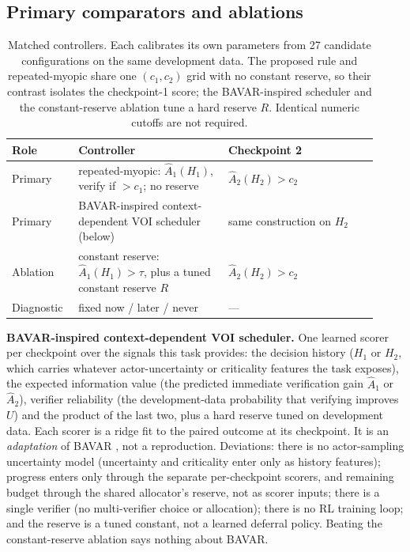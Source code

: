 \subsection{Primary comparators and ablations}

\begin{table}[t]
\centering
\small
\setlength{\tabcolsep}{4pt}
\begin{tabular}{@{}p{0.16\linewidth}p{0.38\linewidth}p{0.38\linewidth}@{}}
\toprule
Role & Controller & Checkpoint 2 \\
\midrule
Primary & repeated-myopic: $\hat A_1(H_1)$, verify if $>c_1$; no reserve & $\hat A_2(H_2)>c_2$ \\
Primary & BAVAR-inspired context-dependent VOI scheduler (below) & same construction on $H_2$ \\
Ablation & constant reserve: $\hat A_1(H_1)>\tau$, plus a tuned constant reserve $R$ & $\hat A_2(H_2)>c_2$ \\
Diagnostic & fixed now / later / never & --- \\
\bottomrule
\end{tabular}
\caption{Matched controllers.  Each calibrates its own parameters from 27
candidate configurations on the same development data.  The proposed rule and
repeated-myopic share one $(c_1,c_2)$ grid with no constant reserve, so their
contrast isolates the checkpoint-1 score; the BAVAR-inspired scheduler and the
constant-reserve ablation tune a hard reserve $R$.  Identical numeric cutoffs are
not required.}
\label{tab:b-comparators}
\end{table}

\textbf{BAVAR-inspired context-dependent VOI scheduler.}  One learned scorer per
checkpoint over the signals this task provides: the decision history ($H_1$ or
$H_2$, which carries whatever actor-uncertainty or criticality features the task
exposes), the expected information value (the predicted immediate verification
gain $\hat A_1$ or $\hat A_2$), verifier reliability (the development-data
probability that verifying improves $U$) and the product of the last two, plus a
hard reserve tuned on development data.  Each scorer is a ridge fit to the
paired outcome at its checkpoint.  It is an \emph{adaptation} of BAVAR
\citep{adeli2026bavar}, not a reproduction.  Deviations: there is no
actor-sampling uncertainty model (uncertainty and criticality enter only as
history features); progress enters only through the separate per-checkpoint
scorers, and remaining budget through the shared allocator's reserve, not as
scorer inputs; there is a single verifier (no multi-verifier choice or
allocation); there is no RL training loop; and the reserve is a tuned constant,
not a learned deferral policy.  Beating the constant-reserve ablation says
nothing about BAVAR.

